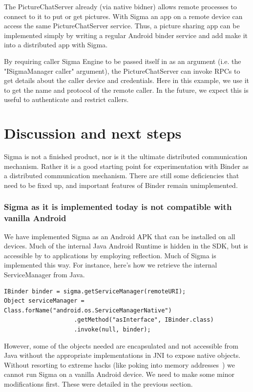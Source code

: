 \documentclass[prodmode]{acmlarge}
\begin{document}
The PictureChatServer already (via native bidner) allows remote processes to connect to it to put or get pictures. With Sigma an app on a remote device can access the same PictureChatServer service. Thus, a picture sharing app can be implemented simply by writing a regular Android binder service and add make it into a distributed app with Sigma.

By requiring caller Sigma Engine to be passed itself in as an argument (i.e. the "ISigmaManager caller" argument), the PictureChatServer can invoke RPCs to get details about the caller device and credentials. Here in this example, we use it to get the name and protocol of the remote caller. In the future, we expect this is useful to authenticate and restrict callers.


\section{Discussion and next steps}
Sigma is not a finished product, nor is it the ultimate distributed communication mechanism. Rather it is a good starting point for experimentation with Binder as a distributed communication mechanism. There are still some deficiencies that need to be fixed up, and important features of Binder remain unimplemented.

\subsubsection{Sigma as it is implemented today is not compatible with vanilla Android}
We have implemented Sigma as an Android APK that can be installed on all devices. Much of the internal Java Android Runtime is hidden in the SDK, but is accessible by to applications by employing reflection. Much of Sigma is implemented this way. For instance, here's how we retrieve the internal ServiceManager from Java.

\begin{Verbatim}[samepage=true]
IBinder binder = sigma.getServiceManager(remoteURI);
Object serviceManager = Class.forName("android.os.ServiceManagerNative")
                    .getMethod("asInterface", IBinder.class)
                    .invoke(null, binder);
\end{Verbatim}

However, some of the objects needed are encapsulated and not accessible from Java without the appropriate implementations in JNI to expose native objects. Without resorting to extreme hacks (like poking into memory addresses~\cite{FacebookDalvikHacks}) we cannot run Sigma on a vanilla Android device. We need to make some minor modifications first. These were detailed in the previous section.
\end{document}
